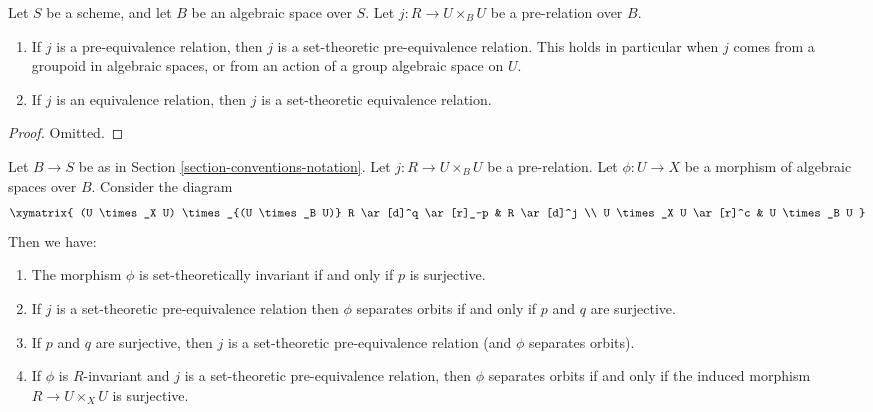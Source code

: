 \begin{lemma}
\label{lemma-set-theoretic-equivalence}
Let $S$ be a scheme, and let $B$ be an algebraic space over $S$.
Let $j : R \to U \times_B U$ be a pre-relation over $B$.
\begin{enumerate}
\item If $j$ is a pre-equivalence relation, then $j$ is a
set-theoretic pre-equivalence relation. This holds in particular
when $j$ comes from a groupoid in algebraic spaces, or from an
action of a group algebraic space on $U$.
\item If $j$ is an equivalence relation, then $j$ is a
set-theoretic equivalence relation.
\end{enumerate}
\end{lemma}

\begin{proof}
Omitted.
\end{proof}

\begin{lemma}
\label{lemma-separates-orbits}
Let $B \to S$ be as in Section \ref{section-conventions-notation}.
Let $j : R \to U \times_B U$ be a pre-relation.
Let $\phi : U \to X$ be a morphism of algebraic spaces over $B$.
Consider the diagram
$$
\xymatrix{
(U \times_X U) \times_{(U \times_B U)} R \ar[d]^q \ar[r]_-p & R \ar[d]^j \\
U \times_X U \ar[r]^c & U \times_B U
}
$$
Then we have:
\begin{enumerate}
\item The morphism $\phi$ is set-theoretically invariant if and only
if $p$ is surjective.
\item If $j$ is a set-theoretic pre-equivalence relation then
$\phi$ separates orbits if and only if $p$ and $q$ are surjective.
\item If $p$ and $q$ are surjective, then $j$ is a set-theoretic
pre-equivalence relation (and $\phi$ separates orbits).
\item If $\phi$ is $R$-invariant and $j$ is a set-theoretic pre-equivalence
relation, then $\phi$ separates orbits if and only if the induced morphism
$R \to U \times_X U$ is surjective.
\end{enumerate}
\end{lemma}

